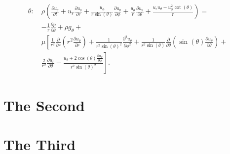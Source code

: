 \begin{align}
\begin{split}
  \theta:\  &\rho \left(\frac{\partial u_{\theta}}{\partial t} + u_r \frac{\partial u_{\theta}}{\partial r} +
                        \frac{u_{\phi}}{r \sin(\theta)} \frac{\partial u_{\theta}}{\partial \phi} +
                        \frac{u_{\theta}}{r} \frac{\partial u_{\theta}}{\partial \theta} + \frac{u_r u_{\theta} - u_{\phi}^2 \cot(\theta)}{r}\right) =\\
                 &-\frac{1}{r} \frac{\partial p}{\partial \theta} + \rho g_{\theta} + \\
            &\mu \left[\frac{1}{r^2} \frac{\partial}{\partial r}\left(r^2 \frac{\partial u_{\theta}}{\partial r}\right) +
                       \frac{1}{r^2 \sin(\theta)^2} \frac{\partial^2 u_{\theta}}{\partial \phi^2} +
                       \frac{1}{r^2 \sin(\theta)} \frac{\partial}{\partial \theta}\left(\sin(\theta) \frac{\partial u_{\theta}}{\partial \theta}\right) +\right.\\
                     &\left.
                       \frac{2}{r^2} \frac{\partial u_r}{\partial \theta} - \frac{u_{\theta} +
                       2 \cos(\theta) \frac{\partial u_{\phi}}{\partial \phi}}{r^2 \sin(\theta)^2}
                 \right].
\label{eq:navier-stokes-momentum-theta}
\end{split}
\end{align}


\part{The Second}

\Blinddocument


\part{The Third}

\blinddocument